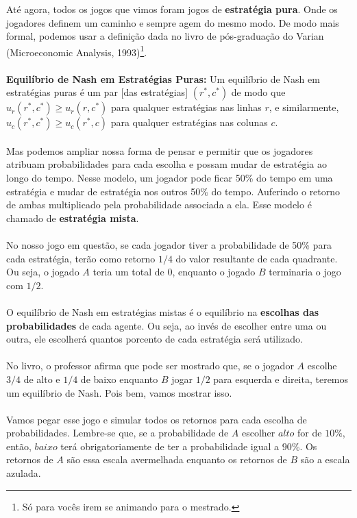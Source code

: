 \documentclass[a4paper,11pt,oneside]{book}
\theoremstyle{definition}
\theoremstyle{break}
\begin{document}
Até agora, todos os jogos que vimos foram jogos de \textbf{estratégia pura}. Onde os jogadores definem um caminho e sempre agem do mesmo modo. De modo mais formal, podemos usar a definição dada no livro de pós-graduação do Varian (Microeconomic Analysis, 1993)\footnote{Só para vocês irem se animando para o mestrado.}.
\\~\\
\textbf{Equilíbrio de Nash em Estratégias Puras:} Um equilíbrio de Nash em estratégias puras é um par [das estratégias] $(r^*,c^*)$ de modo que $u_r(r^*,c^*) \geq u_r(r,c^*)$ para qualquer estratégias nas linhas $r$, e similarmente, $u_c(r^*,c^*) \geq u_c(r^*,c)$ para qualquer estratégias nas colunas $c$.
\\~\\
Mas podemos ampliar nossa forma de pensar e permitir que os jogadores atribuam probabilidades para cada escolha e possam mudar de estratégia ao longo do tempo. Nesse modelo, um jogador pode ficar 50\% do tempo em uma estratégia e mudar de estratégia nos outros 50\% do tempo. Auferindo o retorno de ambas multiplicado pela probabilidade associada a ela. Esse modelo é chamado de \textbf{estratégia mista}.
\\~\\
No nosso jogo em questão, se cada jogador tiver a probabilidade de 50\% para cada estratégia, terão como retorno $1/4$ do valor resultante de cada quadrante. Ou seja, o jogado $A$ teria um total de $0$, enquanto o jogado $B$ terminaria o jogo com $1/2$.
\\~\\
O equilíbrio de Nash em estratégias mistas é o equilíbrio na \textbf{escolhas das probabilidades} de cada agente. Ou seja, ao invés de escolher entre uma ou outra, ele escolherá quantos porcento de cada estratégia será utilizado. 
\\~\\
No livro, o professor afirma que pode ser mostrado que, se o jogador $A$ escolhe $3/4$ de alto e $1/4$ de baixo enquanto $B$ jogar $1/2$ para esquerda e direita, teremos um equilíbrio de Nash. Pois bem, vamos mostrar isso.
\\~\\
Vamos pegar esse jogo e simular todos os retornos para cada escolha de probabilidades. Lembre-se que, se a probabilidade de $A$ escolher $alto$ for de $10\%$, então, $baixo$ terá obrigatoriamente de ter a probabilidade igual a $90\%$. Os retornos de $A$ são essa escala avermelhada enquanto os retornos de $B$ são a escala azulada.
\end{document}
